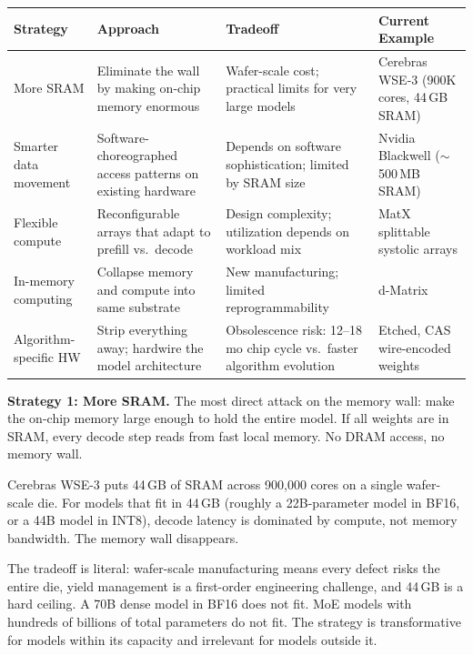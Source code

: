 \medskip

{\small
\begin{center}
\begin{tabular}{@{}p{2.6cm}p{3.8cm}p{3.8cm}p{3.2cm}@{}}
\toprule
\textbf{Strategy} & \textbf{Approach} & \textbf{Tradeoff} & \textbf{Current Example} \\
\midrule
More SRAM          & Eliminate the wall by making on-chip memory enormous
                   & Wafer-scale cost; practical limits for very large models
                   & Cerebras WSE-3 (900K cores, 44\,GB SRAM) \\[4pt]
Smarter data movement & Software-choreographed access patterns on existing hardware
                   & Depends on software sophistication; limited by SRAM size
                   & Nvidia Blackwell ($\sim$500\,MB SRAM) \\[4pt]
Flexible compute   & Reconfigurable arrays that adapt to prefill vs.\ decode
                   & Design complexity; utilization depends on workload mix
                   & MatX splittable systolic arrays \\[4pt]
In-memory computing & Collapse memory and compute into same substrate
                   & New manufacturing; limited reprogrammability
                   & d-Matrix \\[4pt]
Algorithm-specific HW & Strip everything away; hardwire the model architecture
                   & Obsolescence risk: 12--18\,mo chip cycle vs.\ faster algorithm evolution
                   & Etched, CAS wire-encoded weights \\
\bottomrule
\end{tabular}
\end{center}
}

\medskip

\textbf{Strategy 1: More SRAM.} The most direct attack on the memory wall: make the on-chip memory large enough to hold the entire model. If all weights are in SRAM, every decode step reads from fast local memory. No DRAM access, no memory wall.

Cerebras WSE-3 puts 44\,GB of SRAM across 900,000 cores on a single wafer-scale die. For models that fit in 44\,GB (roughly a 22B-parameter model in BF16, or a 44B model in INT8), decode latency is dominated by compute, not memory bandwidth. The memory wall disappears.

The tradeoff is literal: wafer-scale manufacturing means every defect risks the entire die, yield management is a first-order engineering challenge, and 44\,GB is a hard ceiling. A 70B dense model in BF16 does not fit. MoE models with hundreds of billions of total parameters do not fit. The strategy is transformative for models within its capacity and irrelevant for models outside it.

